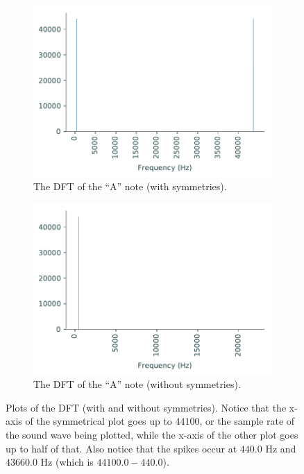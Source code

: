\begin{figure}
\captionsetup[subfigure]{justification=centering}
\centering
\begin{subfigure}{.4\textwidth}
    \centering
    \includegraphics[width=\linewidth]{figures/dft_a.pdf}
    \caption{The DFT of the ``A'' note (with symmetries).}
    \label{fig:dft_a}
\end{subfigure}
\begin{subfigure}{.4\textwidth}
    \centering
    \includegraphics[width=\linewidth]{figures/dft_a_half.pdf}
    \caption{The DFT of the ``A'' note (without symmetries).}
    \label{fig:dft_a_half}
\end{subfigure}
\label{fig:DFTs}
\caption{Plots of the DFT (with and without symmetries).
Notice that the x-axis of the symmetrical plot goes up to $44100$, or the sample rate of the sound wave being plotted, while the x-axis of the other plot goes up to half of that.
Also notice that the spikes occur at $440.0$ Hz and $43660.0$ Hz (which is $44100.0 - 440.0$).}
\end{figure}

